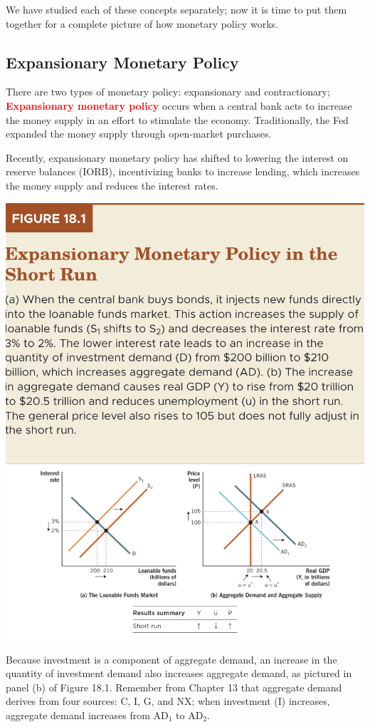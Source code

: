 \documentclass[11pt]{article} %
\begin{document}
We have studied each of these concepts separately; now it is time to put them together for a complete picture of how monetary policy works.
\subsection*{Expansionary Monetary Policy}
There are two types of monetary policy: expansionary and contractionary; \textbf{\textcolor{red}{Expansionary monetary policy}} occurs when a central bank acts to increase the money supply in an effort to stimulate the economy. Traditionally, the Fed expanded the money supply through open-market purchases.

Recently, expansionary monetary policy has shifted to lowering the interest on reserve balances (IORB), incentivizing banks to increase lending, which increases the money supply and reduces the interest rates.

\begin{center}
\includegraphics[scale=0.5]{images/Figure 18.1.png} 
\end{center}
Because investment is a component of aggregate demand, an increase in the quantity of investment demand also increases aggregate demand, as pictured in panel (b) of Figure 18.1. Remember from Chapter 13 that aggregate demand derives from four sources: C, I, G, and NX; when investment (I) increases, aggregate demand increases from $\text{AD}_1$ to $\text{AD}_2$.
\end{document}
